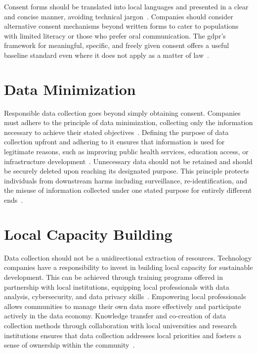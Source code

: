 \documentclass[11pt,showkeys]{essay}
\begin{document}
Consent forms should be translated into local languages and presented in a clear and concise manner, avoiding technical jargon~\cite{jobin_global_2019}. Companies should consider alternative consent mechanisms beyond written forms to cater to populations with limited literacy or those who prefer oral communication. The \gls{gdpr}'s framework for meaningful, specific, and freely given consent offers a useful baseline standard even where it does not apply as a matter of law~\cite{parliament_regulation_2016}.

\section{Data Minimization}

Responsible data collection goes beyond simply obtaining consent. Companies must adhere to the principle of data minimization, collecting only the information necessary to achieve their stated objectives~\cite{aggarwal_general_2008}. Defining the purpose of data collection upfront and adhering to it ensures that information is used for legitimate reasons, such as improving public health services, education access, or infrastructure development~\cite{parliament_regulation_2016}. Unnecessary data should not be retained and should be securely deleted upon reaching its designated purpose. This principle protects individuals from downstream harms including surveillance, re-identification, and the misuse of information collected under one stated purpose for entirely different ends~\cite{ohm_broken_2010}.

\section{Local Capacity Building}

Data collection should not be a unidirectional extraction of resources. Technology companies have a responsibility to invest in building local capacity for sustainable development. This can be achieved through training programs offered in partnership with local institutions, equipping local professionals with data analysis, cybersecurity, and data privacy skills~\cite{hanna_how_2017}. Empowering local professionals allows communities to manage their own data more effectively and participate actively in the data economy. Knowledge transfer and co-creation of data collection methods through collaboration with local universities and research institutions ensures that data collection addresses local priorities and fosters a sense of ownership within the community~\cite{runde_innovative_2022}.
\end{document}
